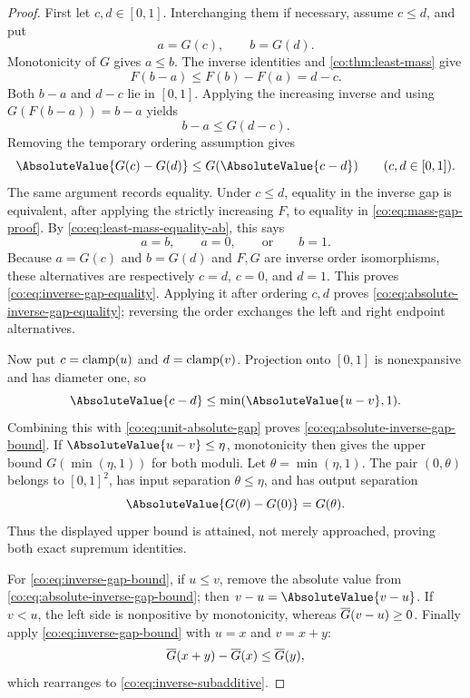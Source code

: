 \begin{proof}
First let $c,d\in[0,1]$.  Interchanging them if necessary, assume $c\le d$,
and put
\[
 a=G(c),\qquad b=G(d).
\]
Monotonicity of $G$ gives $a\le b$.  The inverse identities and
\cref{co:thm:least-mass} give
\begin{equation}\label{co:eq:mass-gap-proof}
 F(b-a)\le F(b)-F(a)=d-c.
\end{equation}
Both $b-a$ and $d-c$ lie in $[0,1]$.  Applying the increasing inverse and
using $G(F(b-a))=b-a$ yields
\[
 b-a\le G(d-c).
\]
Removing the temporary ordering assumption gives
\begin{equation}\label{co:eq:unit-absolute-gap}
 \AbsoluteValue{G(c)-G(d)}\le G(\AbsoluteValue{c-d})
 \qquad(c,d\in[0,1]).
\end{equation}
The same argument records equality.  Under $c\le d$, equality in the inverse
gap is equivalent, after applying the strictly increasing $F$, to equality in
\eqref{co:eq:mass-gap-proof}.  By \eqref{co:eq:least-mass-equality-ab}, this says
\[
 a=b,\qquad a=0,\qquad\text{or}\qquad b=1.
\]
Because $a=G(c)$ and $b=G(d)$ and $F,G$ are inverse order isomorphisms, these
alternatives are respectively $c=d$, $c=0$, and $d=1$.  This proves
\eqref{co:eq:inverse-gap-equality}.  Applying it after ordering $c,d$ proves
\eqref{co:eq:absolute-inverse-gap-equality}; reversing the order exchanges the
left and right endpoint alternatives.

Now put $c=\operatorname{clamp}(u)$ and $d=\operatorname{clamp}(v)$.  Projection onto $[0,1]$ is
nonexpansive and has diameter one, so
\[
 \AbsoluteValue{c-d}\le\min(\AbsoluteValue{u-v},1).
\]
Combining this with \eqref{co:eq:unit-absolute-gap} proves
\eqref{co:eq:absolute-inverse-gap-bound}.  If $\AbsoluteValue{u-v}\le\eta$, monotonicity
then gives the upper bound $G(\min(\eta,1))$ for both moduli.  Let
$\theta=\min(\eta,1)$.  The pair $(0,\theta)$ belongs to $[0,1]^2$, has input
separation $\theta\le\eta$, and has output separation
\[
 \AbsoluteValue{G(\theta)-G(0)}=G(\theta).
\]
Thus the displayed upper bound is attained, not merely approached, proving
both exact supremum identities.

For \eqref{co:eq:inverse-gap-bound}, if $u\le v$, remove the absolute value from
\eqref{co:eq:absolute-inverse-gap-bound}; then $v-u=\AbsoluteValue{v-u}$.  If $v<u$, the
left side is nonpositive by monotonicity, whereas $\overline G(v-u)\ge0$.
Finally apply \eqref{co:eq:inverse-gap-bound} with $u=x$ and $v=x+y$:
\[
 \overline G(x+y)-\overline G(x)\le\overline G(y),
\]
which rearranges to \eqref{co:eq:inverse-subadditive}.
\end{proof}

